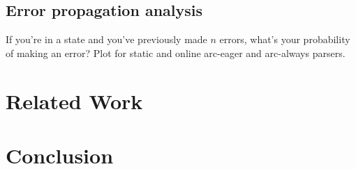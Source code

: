 \documentclass[11pt,letterpaper]{article}
\begin{document}
\subsection{Error propagation analysis}

If you're in a state and you've previously made $n$ errors, what's your probability
of making an error? Plot for static and online arc-eager and arc-always parsers.

\clearpage

\section{Related Work}
\pagebreak

\section{Conclusion}




\end{document}

